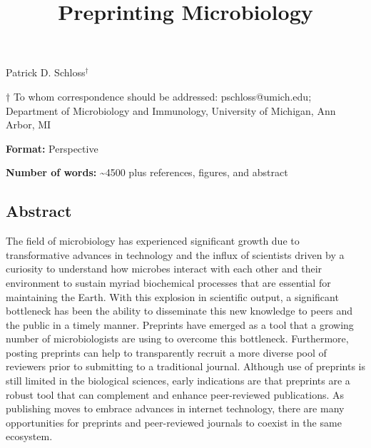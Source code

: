 \documentclass[11pt,]{article}
\title{\textbf{Preprinting Microbiology}}
\author{}
\date{}
\begin{document}
\maketitle

\begin{center}
\vspace{25mm}
Patrick D. Schloss${^\dagger}$

\vspace{30mm}

$\dagger$ To whom correspondence should be addressed: pschloss@umich.edu; Department of Microbiology and Immunology, University of Michigan, Ann Arbor, MI

\vspace{10mm}

\textbf{Format:} Perspective

\textbf{Number of words:} \textasciitilde4500 plus references, figures, and abstract

\end{center}

\newpage

\linenumbers

\subsection{Abstract}\label{abstract}

The field of microbiology has experienced significant growth due to
transformative advances in technology and the influx of scientists
driven by a curiosity to understand how microbes interact with each
other and their environment to sustain myriad biochemical processes that
are essential for maintaining the Earth. With this explosion in
scientific output, a significant bottleneck has been the ability to
disseminate this new knowledge to peers and the public in a timely
manner. Preprints have emerged as a tool that a growing number of
microbiologists are using to overcome this bottleneck. Furthermore,
posting preprints can help to transparently recruit a more diverse pool
of reviewers prior to submitting to a traditional journal. Although use
of preprints is still limited in the biological sciences, early
indications are that preprints are a robust tool that can complement and
enhance peer-reviewed publications. As publishing moves to embrace
advances in internet technology, there are many opportunities for
preprints and peer-reviewed journals to coexist in the same ecosystem.

\newpage
\end{document}
